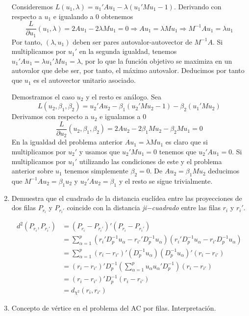 \documentclass[twoside]{article}
\begin{document}
\begin{enumerate}
Consideremos $L(u_1,\lambda) = u_1'Au_1 - \lambda(u_1'Mu_1-1)$. Derivando con respecto a $u_1$ e igualando a $0$ obtenemos
$$
\frac{L}{\partial u_1}(u_1,\lambda)= 2Au_1 -2\lambda Mu_1 = 0 \Rightarrow Au_1 = \lambda M u_1 \Rightarrow  M^{-1}A u_1 = \lambda u_1
$$
Por tanto, $(\lambda,u_1)$ deben ser pares autovalor-autovector de $M^{-1}A$. Si multiplicamos por $u_1'$ en la segunda igualdad, tenemos $u_1' A u_1 = \lambda u_1'Mu_1 = \lambda$, por lo que la función objetivo se maximiza en un autovalor que debe ser, por tanto, el máximo autovalor. Deducimos por tanto que $u_1$ es el autovector unitario asociado. 

Demostramos el caso $u_2$ y el resto es análogo. Sea
$$
L(u_2,\beta_1,\beta_2) = u_2'Au_2 - \beta_1(u_2'Mu_2-1) - \beta_2(u_1'Mu_2)
$$
Derivamos con respecto a $u_2$ e igualamos a $0$
$$
\frac{L}{\partial u_2}(u_2,\beta_1,\beta_2) = 2Au_2 -2\beta_1 Mu_2 - \beta_2Mu_1 = 0 
$$
En la igualdad del problema anterior $Au_1 = \lambda Mu_1$ es claro que si multiplicamos por $u_2'$ y usamos que $u_2'Mu_1=0$ tenemos que $u_2'Au_1 =0$. Si multiplicamos por $u_1'$ utilizando las condiciones de este y el problema anterior sobre $u_1$ tenemos simplemente $\beta_2 = 0$. De $Au_2 = \beta_1 M u_2$ deducimos que $M^{-1}Au_2 =\beta_1 u_2$ y $u_2'Au_2 = \beta_1$ y el resto se sigue trivialmente.


\item Demuestra que el cuadrado de la distancia euclídea entre las proyecciones de dos filas $P_{r_i}$ y $P_{r_i'}$ coincide con la distancia \emph{ji−cuadrado} entre las filas $r_i$ y $r_i'$.


\begin{align*}
d^2(P_{r_i},P_{r_i'}) &= (P_{r_i}-P_{r_i'})'(P_{r_i}-P_{r_i'})\\
&=\sum_{\alpha=1}^p (r_i' D^{-1}_p u_\alpha - r_{i'}' D^{-1}_p u_\alpha )(r_i' D^{-1}_p u_\alpha - r_{i'} D^{-1}_p u_\alpha )\\
&=\sum_{\alpha=1}^p (r_i-r_{i'})' (D^{-1}_p u_\alpha)(D^{-1}_p u_\alpha)'(r_i-r_{i'})\\
&=(r_i-r_{i'})'D^{-1}_p\left(\sum_{\alpha=1}^p u_\alpha  u_\alpha' D^{-1}_p \right)(r_i-r_{i'})\\
&=(r_i-r_{i'})'D^{-1}_p(r_i-r_{i'})\\
&= d_{\chi^2}(r_i,r_{i'})
\end{align*}


\item Concepto de vértice en el problema del AC por filas. Interpretación. 


\end{enumerate}
\end{document}
